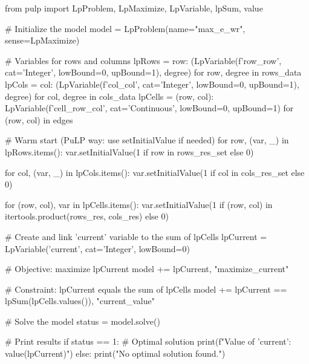 from pulp import LpProblem, LpMaximize, LpVariable, lpSum, value

# Initialize the model
model = LpProblem(name="max_e_wr", sense=LpMaximize)

# Variables for rows and columns
lpRows = {row: (LpVariable(f'row_{row}', cat='Integer', lowBound=0, upBound=1), degree) for row, degree in rows_data}
lpCols = {col: (LpVariable(f'col_{col}', cat='Integer', lowBound=0, upBound=1), degree) for col, degree in cols_data}
lpCells = {(row, col): LpVariable(f'cell_{row}_{col}', cat='Continuous', lowBound=0, upBound=1) for (row, col) in edges}

# Warm start (PuLP way: use setInitialValue if needed)
for row, (var, _) in lpRows.items():
    var.setInitialValue(1 if row in rows_res_set else 0)

for col, (var, _) in lpCols.items():
    var.setInitialValue(1 if col in cols_res_set else 0)

for (row, col), var in lpCells.items():
    var.setInitialValue(1 if (row, col) in itertools.product(rows_res, cols_res) else 0)

# Create and link 'current' variable to the sum of lpCells
lpCurrent = LpVariable('current', cat='Integer', lowBound=0)

# Objective: maximize lpCurrent
model += lpCurrent, "maximize_current"

# Constraint: lpCurrent equals the sum of lpCells
model += lpCurrent == lpSum(lpCells.values()), "current_value"

# Solve the model
status = model.solve()

# Print results
if status == 1:  # Optimal solution
    print(f"Value of 'current': {value(lpCurrent)}")
else:
    print("No optimal solution found.")
